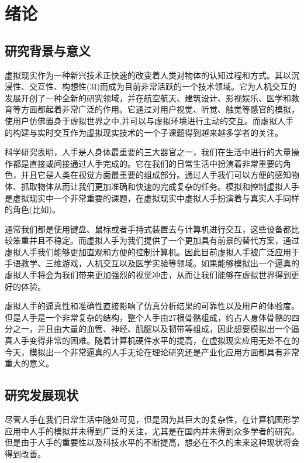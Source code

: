 \chapter{绪论}
\label{chap:quickstart}

\section{研究背景与意义}
虚拟现实作为一种新兴技术正快速的改变着人类对物体的认知过程和方式。其以沉浸性、交互性、构想性(3I)而成为目前非常活跃的一个技术领域。它为人机交互的发展开创了一种全新的研究领域，并在航空航天、建筑设计、影视娱乐、医学和教育等方面都起着非常广泛的作用。它通过对用户视觉、听觉、触觉等感官的模拟，使用户仿佛置身于虚拟世界之中,并可以与虚拟环境进行主动的交互。而虚拟人手的构建与实时交互作为虚拟现实技术的一个子课题得到越来越多学者的关注。

科学研究表明，人手是人身体最重要的三大器官之一，我们在生活中进行的大量操作都是直接或间接通过人手完成的。它在我们的日常生活中扮演着非常重要的角色，并且它是人类在视觉方面最重要的组成部分。通过人手我们可以方便的感知物体、抓取物体从而让我们更加准确和快速的完成复杂的任务。模拟和控制虚拟人手是虚拟现实中一个非常重要的课题，在虚拟现实中虚拟人手扮演着与真实人手同样的角色(比如\cite{Wang13})。

通常我们都是使用键盘、鼠标或者手持式装置去与计算机进行交互，这些设备都比较笨重并且不稳定。而虚拟人手为我们提供了一个更加具有前景的替代方案，通过虚拟人手我们能够更加直观和方便的控制计算机。因此目前虚拟人手被广泛应用于手语教学、三维游戏，人机交互以及医学实验等领域。如果能够模拟出一个逼真的虚拟人手将会为我们带来更加强烈的视觉冲击，从而让我们能够在虚拟世界得到更好的体验。

虚拟人手的逼真性和准确性直接影响了仿真分析结果的可靠性以及用户的体验度。但是人手是一个非常复杂的结构，整个人手由27根骨骼组成，约占人身体骨骼的四分之一，并且由大量的血管、神经、肌腱以及韧带等组成，因此想要模拟出一个逼真人手变得非常的困难。随着计算机硬件水平的提高，在虚拟现实应用无处不在的今天，模拟出一个非常逼真的人手无论在理论研究还是产业化应用方面都具有非常重大的意义。

\section{研究发展现状}

尽管人手在我们日常生活中随处可见，但是因为其巨大的复杂性，在计算机图形学应用中人手的模拟并未得到广泛的关注，尤其是在国内并未得到众多学者的研究。但是由于人手的重要性以及科技水平的不断提高，想必在不久的未来这种现状将会得到改善。

